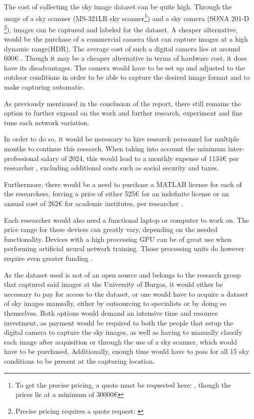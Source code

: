 The cost of collecting the sky image dataset can be quite high. Through the usage of a sky scanner (MS-321LR sky scanner\footnote{To get the precise pricing, a quote must be requested here: \cite{eko:scanner}, though the prices lie at a minimum of 30000€}) and a sky camera (SONA 201-D \footnote{Precise pricing requires a quote request: \cite{sona:cam}}), images can be captured and labeled for the dataset. A cheaper alternative, would be the purchase of a commercial camera that can capture images at a high dynamic range(HDR). The average cost of such a digital camera lies at around 600€ \cite{digi:cam}. Though it may be a cheaper alternative in terms of hardware cost, it does have its disadvantages. The camera would have to be set up and adjusted to the outdoor conditions in order to be able to capture the desired image format and to make capturing automatic. 

As previously mentioned in the conclusion of the report, there still remains the option to further expand on the work and further research, experiment and fine tune each network variation.

In order to do so, it would be necessary to hire research personnel for multiple months to continue this research. When taking into account the minimum inter-professional salary of 2024, this would lead to a monthly expense of 1134€ per researcher \cite{salary:gobEsp}, excluding additional costs such as social security and taxes.

Furthermore, there would be a need to purchase a MATLAB license for each of the researchers, forcing a price of either 525€ for an indefinite license or an annual cost of 262€ for academic institutes, per researcher \cite{matlab:cost}.

Each researcher would also need a functional laptop or computer to work on. The price range for these devices can greatly vary, depending on the needed functionality. Devices with a high processing GPU can be of great use when performing artificial neural network training. Those processing units do however require even greater funding \cite{digitaltrends:gpucost}.

As the dataset used is not of an open source and belongs to the research group that captured said images at the University of Burgos, it would either be necessary to pay for access to the dataset, or one would have to acquire a dataset of sky images manually, either by outsourcing to specialists or by doing so themselves. Both options would demand an intensive time and resource investment, as payment would be required to both the people that setup the digital camera to capture the sky images, as well as having to manually classify each image after acquisition or through the use of a sky scanner, which would have to be purchased. Additionally, enough time would have to pass for all 15 sky conditions to be present at the capturing location. 


